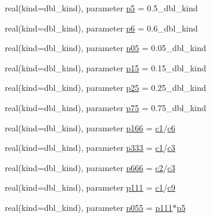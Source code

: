 \begin{DoxyCompactItemize}
\item 
real(kind=dbl\_\-kind), parameter \hyperlink{namespaceice__constants_a26872e9df91fb7484a1a2ddefd7b71b0}{p5} = 0.5\_\-dbl\_\-kind
\item 
real(kind=dbl\_\-kind), parameter \hyperlink{namespaceice__constants_a86103f3a8306abd46a8a68ede82f2ee4}{p6} = 0.6\_\-dbl\_\-kind
\item 
real(kind=dbl\_\-kind), parameter \hyperlink{namespaceice__constants_aec49f3df6ec3235c6304038e8fddbe00}{p05} = 0.05\_\-dbl\_\-kind
\item 
real(kind=dbl\_\-kind), parameter \hyperlink{namespaceice__constants_a8312dd00bbc8aad76e555bff87f11f47}{p15} = 0.15\_\-dbl\_\-kind
\item 
real(kind=dbl\_\-kind), parameter \hyperlink{namespaceice__constants_acf8570fae8090e3892e40648fe1a0036}{p25} = 0.25\_\-dbl\_\-kind
\item 
real(kind=dbl\_\-kind), parameter \hyperlink{namespaceice__constants_a266f93c94a2bacfaea88290d50220b36}{p75} = 0.75\_\-dbl\_\-kind
\item 
real(kind=dbl\_\-kind), parameter \hyperlink{namespaceice__constants_ab9c8c51bf25c869a87c12048d123a2c6}{p166} = \hyperlink{namespaceice__constants_a74c3f6d59942aec40dda487c6af99039}{c1}/\hyperlink{namespaceice__constants_aa876727d14c4b68b2c933645bde4592a}{c6}
\item 
real(kind=dbl\_\-kind), parameter \hyperlink{namespaceice__constants_a9dfb9e1671683be9cb08717f174638cc}{p333} = \hyperlink{namespaceice__constants_a74c3f6d59942aec40dda487c6af99039}{c1}/\hyperlink{namespaceice__constants_a0ae384e716bc1243a7bd1c6d1ace209f}{c3}
\item 
real(kind=dbl\_\-kind), parameter \hyperlink{namespaceice__constants_a623680825d166c04e044e75e3eb2d6be}{p666} = \hyperlink{namespaceice__constants_a683e0c28523a17a5d2cd40066167570a}{c2}/\hyperlink{namespaceice__constants_a0ae384e716bc1243a7bd1c6d1ace209f}{c3}
\item 
real(kind=dbl\_\-kind), parameter \hyperlink{namespaceice__constants_a8bd880bb5783b5dc60e535b9fc37c3e7}{p111} = \hyperlink{namespaceice__constants_a74c3f6d59942aec40dda487c6af99039}{c1}/\hyperlink{namespaceice__constants_a8fad19fc3e19d7387132c4b3184f62d8}{c9}
\item 
real(kind=dbl\_\-kind), parameter \hyperlink{namespaceice__constants_aa715e54741a308eed3ebb5bfe30d82c2}{p055} = \hyperlink{namespaceice__constants_a8bd880bb5783b5dc60e535b9fc37c3e7}{p111}$\ast$\hyperlink{namespaceice__constants_a26872e9df91fb7484a1a2ddefd7b71b0}{p5}

\end{DoxyCompactItemize}
